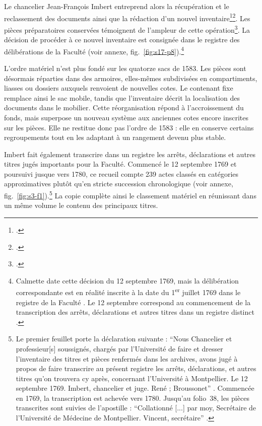 Le chancelier Jean-François Imbert entreprend alors la récupération et le reclassement des documents ainsi que la rédaction d'un nouvel inventaire\footcite[p.~XV--XVII, vues~34 à 35 de la version numérisée]{CalmetteCartulaire1912}\footcite{Dulieu1956Imbert}. Les pièces préparatoires conservées témoignent de l'ampleur de cette opération\footcite{AHFMA5}. La décision de procéder à ce nouvel inventaire est consignée dans le registre des délibérations de la Faculté (voir annexe, fig.~\ref{fig:s17-p8}).\footnote{Calmette date cette décision du 12 septembre 1769, mais la délibération correspondante est en réalité inscrite à la date du 1\textsuperscript{er} juillet 1769 dans le registre de la Faculté \parencite{AHFMS17}. Le 12 septembre correspond au commencement de la transcription des arrêts, déclarations et autres titres dans un registre distinct \parencite[fol.~1]{AHFMS3}.}

L'ordre matériel n'est plus fondé sur les quatorze sacs de 1583. Les pièces sont désormais réparties dans des armoires, elles-mêmes subdivisées en compartiments, liasses ou dossiers auxquels renvoient de nouvelles cotes. Le contenant fixe remplace ainsi le sac mobile, tandis que l'inventaire décrit la localisation des documents dans le mobilier. Cette réorganisation répond à l'accroissement du fonds, mais superpose un nouveau système aux anciennes cotes encore inscrites sur les pièces. Elle ne restitue donc pas l'ordre de 1583 : elle en conserve certains regroupements tout en les adaptant à un rangement devenu plus stable.

Imbert fait également transcrire dans un registre les arrêts, déclarations et autres titres jugés importants pour la Faculté. Commencé le 12 septembre 1769 et poursuivi jusque vers 1780, ce recueil compte 239 actes classés en catégories approximatives plutôt qu'en stricte succession chronologique (voir annexe, fig.~\ref{fig:s3-f1}).\footnote{Le premier feuillet porte la déclaration suivante : \enquote{Nous Chancelier et professieur[s] soussignés, chargés par l'Université de faire et dresser l'inventaire des titres et pièces renfermés dans les archives, avons jugé à propos de faire transcrire au présent registre les arrêts, déclarations, et autres titres qu'on trouvera cy après, concernant l'Université à Montpellier. Le 12 septembre 1769. Imbert, chancelier et juge. René ; Broussonet} \parencite[fol.~1]{AHFMS3}. Commencée en 1769, la transcription est achevée vers 1780. Jusqu'au folio~38, les pièces transcrites sont suivies de l'apostille : \enquote{Collationné [...] par moy, Secrétaire de l'Université de Médecine de Montpellier. Vincent, secrétaire} \parencite[p.~XXIII, vue~48 de la version numérisée]{CalmetteCartulaire1912}.} La copie complète ainsi le classement matériel en réunissant dans un même volume le contenu des principaux titres.

